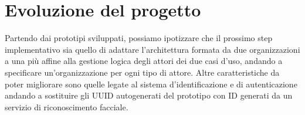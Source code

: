 \section{Evoluzione del progetto}
Partendo dai prototipi sviluppati, possiamo ipotizzare che il prossimo step implementativo sia quello di adattare l'architettura formata da due organizzazioni a una più affine alla gestione logica degli attori dei due casi d'uso, andando a specificare un'organizzazione per ogni tipo di attore. Altre caratteristiche da poter migliorare sono quelle legate al sistema d'identificazione e di autenticazione andando a sostituire gli UUID autogenerati del prototipo con ID generati da un servizio di riconoscimento facciale.
\newpage